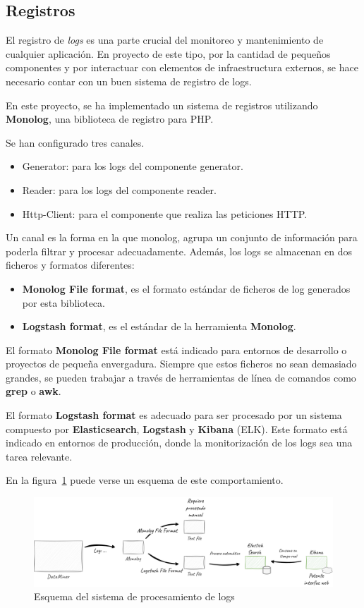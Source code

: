 \subsection*{Registros}\label{subsec:logs}

El registro de \textit{logs} es una parte crucial del monitoreo y mantenimiento de cualquier aplicación.
En proyecto de este tipo, por la cantidad de pequeños componentes y por interactuar con elementos de infraestructura
externos, se hace necesario contar con un buen sistema de registro de logs.

En este proyecto, se ha implementado un sistema de registros utilizando \textbf{Monolog}, una biblioteca de registro
para PHP.

Se han configurado tres canales.

\begin{itemize}
    \item Generator: para los logs del componente generator.
    \item Reader: para los logs del componente reader.
    \item Http-Client: para el componente que realiza las peticiones HTTP.
\end{itemize}

Un canal es la forma en la que monolog, agrupa un conjunto de información para poderla filtrar y procesar adecuadamente.
Además, los logs se almacenan en dos ficheros y formatos diferentes:

\begin{itemize}
    \item \textbf{Monolog File format}, es el formato estándar de ficheros de log generados por esta biblioteca.
    \item \textbf{Logstash format}, es el estándar de la herramienta \textbf{Monolog}.
\end{itemize}

El formato \textbf{Monolog File format} está indicado para entornos de desarrollo o proyectos de pequeña envergadura.
Siempre que estos ficheros no sean demasiado grandes, se pueden trabajar a través de herramientas de línea de comandos
como \textbf{grep} o \textbf{awk}.

El formato \textbf{Logstash format} es adecuado para ser procesado por un sistema compuesto por
\textbf{Elasticsearch}, \textbf{Logstash} y \textbf{Kibana} (ELK).
Este formato está indicado en entornos de producción, donde la monitorización de los logs sea una tarea relevante.

En la figura~\ref{fig:chapter_4.4.logs_overview} puede verse un esquema de este comportamiento.

\begin{figure}[ht]
    \begin{center}
        \includegraphics[width=\textwidth]{./chapter/4/images/chapter_4.4.logs_overview}
        \caption{Esquema del sistema de procesamiento de logs}
        \label{fig:chapter_4.4.logs_overview}
    \end{center}
\end{figure}